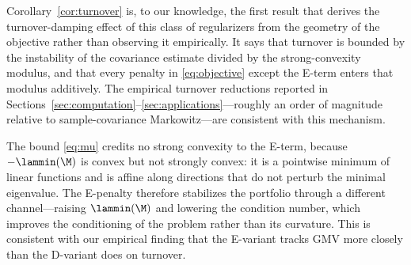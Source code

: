 Corollary~\ref{cor:turnover} is, to our knowledge, the first result that derives
the turnover-damping effect of this class of regularizers from the geometry of
the objective rather than observing it empirically. It says that turnover is
bounded by the instability of the covariance estimate divided by the
strong-convexity modulus, and that every penalty in \eqref{eq:objective} except
the E-term enters that modulus additively. The empirical turnover reductions
reported in Sections~\ref{sec:computation}--\ref{sec:applications}---roughly an
order of magnitude relative to sample-covariance Markowitz---are consistent with
this mechanism.

\begin{remark}
The bound \eqref{eq:mu} credits no strong convexity to the E-term, because
$-\lammin(\M)$ is convex but not strongly convex: it is a pointwise minimum of
linear functions and is affine along directions that do not perturb the minimal
eigenvalue. The E-penalty therefore stabilizes the portfolio through a different
channel---raising $\lammin(\M)$ and lowering the condition number, which improves
the conditioning of the problem rather than its curvature. This is consistent
with our empirical finding that the E-variant tracks GMV more closely than the
D-variant does on turnover.
\end{remark}
